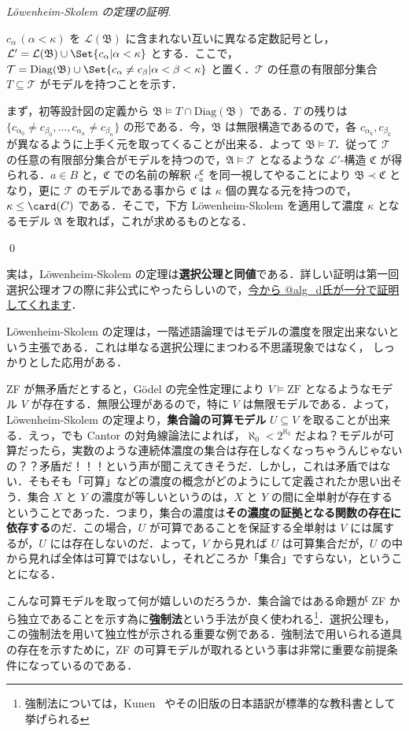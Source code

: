 \documentclass[a4j,xelatex,ja=standard]{ltjsarticle}
\newcommand{\Diag}{\mathrm{Diag}}
\begin{document}
\begin{proof}[L\"{o}wenheim-Skolem の定理の証明]
\begin{enumerate}[label=(\alph{*})]
	$c_\alpha \, (\alpha < \kappa)$ を $\mathcal{L}(\mathfrak{B})$ に含まれない互いに異なる定数記号とし，$\mathcal{L}' = \mathcal{L}(\mathfrak{B}) \cup \Set{ c_\alpha | \alpha < \kappa }$ とする．ここで，$\mathcal{T} = \Diag(\mathfrak{B}) \cup \Set{ c_\alpha \neq c_\beta | \alpha < \beta < \kappa}$ と置く．$\mathcal{T}$ の任意の有限部分集合 $T \subseteq \mathcal{T}$ がモデルを持つことを示す．

	まず，初等設計図の定義から $\mathfrak{B} \models T \cap \Diag(\mathfrak{B})$ である．$T$ の残りは $\{c_{\alpha_0} \neq c_{\beta_0}, \dots, c_{\alpha_n} \neq c_{\beta_n}\}$ の形である．今，$\mathfrak{B}$ は無限構造であるので，各 $c_{\alpha_k}, c_{\beta_k}$ が異なるように上手く元を取ってくることが出来る．よって $\mathfrak{B} \models T$．従って $\mathcal{T}$ の任意の有限部分集合がモデルを持つので，$\mathfrak{A} \models \mathcal{T}$ となるような $\mathcal{L}'$-構造 $\mathfrak{C}$ が得られる．$a \in B$ と，$\mathfrak{C}$ での名前の解釈 $c_a^\mathfrak{C}$ を同一視してやることにより $\mathfrak{B} \prec \mathfrak{C}$ となり，更に $\mathcal{T}$ のモデルである事から $\mathfrak{C}$ は $\kappa$ 個の異なる元を持つので，$\kappa \leq\card(C)$ である．そこで，下方 L\"{o}wenheim-Skolem を適用して濃度 $\kappa$ となるモデル $\mathfrak{A}$ を取れば，これが求めるものとなる． 
 \end{enumerate}\qed
\end{proof}

実は，L\"{o}wenheim-Skolem の定理は{\bfseries 選択公理と同値}である．詳しい証明は第一回選択公理オフの際に非公式にやったらしいので，\href{http://alg-d.com/math/ac/loewenheim_skolem.html}{今から @alg\_d氏が一分で証明してくれます}．

L\"{o}wenheim-Skolem の定理は，一階述語論理ではモデルの濃度を限定出来ないという主張である．これは単なる選択公理にまつわる不思議現象ではなく，
しっかりとした応用がある．

ZF が無矛盾だとすると，G\"{o}del の完全性定理により $V \models \mathrm{ZF}$ となるようなモデル $V$ が存在する．無限公理があるので，特に $V$ は無限モデルである．よって，L\"{o}wenheim-Skolem の定理より，{\bfseries 集合論の可算モデル} $U \subseteq V$ を取ることが出来る．えっ，でも Cantor の対角線論法によれば，$\aleph_0 < 2^{\aleph_0}$ だよね？モデルが可算だったら，実数のような連続体濃度の集合は存在しなくなっちゃうんじゃないの？？矛盾だ！！！という声が聞こえてきそうだ．しかし，これは矛盾ではない．そもそも「可算」などの濃度の概念がどのようにして定義されたか思い出そう．集合 $X$ と $Y$ の濃度が等しいというのは，$X$ と $Y$ の間に全単射が存在するということであった．つまり，集合の濃度は{\bfseries その濃度の証拠となる関数の存在に依存する}のだ．この場合，$U$ が可算であることを保証する全単射は $V$ には属するが，$U$ には存在しないのだ．よって，$V$ から見れば $U$ は可算集合だが，$U$ の中から見れば全体は可算ではないし，それどころか「集合」ですらない，ということになる．

こんな可算モデルを取って何が嬉しいのだろうか．集合論ではある命題が ZF から独立であることを示す為に{\bfseries 強制法}という手法が良く使われる\footnote{強制法については，Kunen~\cite{Kunen:2011} やその旧版の日本語訳が標準的な教科書として挙げられる}．選択公理も，この強制法を用いて独立性が示される重要な例である．強制法で用いられる道具の存在を示すために，ZF の可算モデルが取れるという事は非常に重要な前提条件になっているのである．

\nocite{*}
\printbibliography
\end{document}
